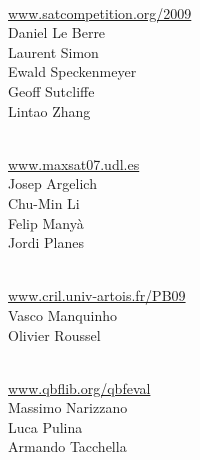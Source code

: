 \documentclass[10pt]{article}
\newcommand{\bthlight}[1]{{\color[rgb]{0.2,0.2,0.5}#1}}
\begin{document}
\begin{minipage}[t]{9.25cm}
  \begin{minipage}[t]{9.25cm}
    \vspace*{0.35cm}
    \begin{minipage}[t]{4.5cm}
      \bthlight{{\bf SAT Competition}} \\
	       {\small \url{www.satcompetition.org/2009}}\\[0.15cm]
	       Daniel Le Berre\\
	       Laurent Simon\\[0.15cm]
	       Ewald Speckenmeyer\\
	       Geoff Sutcliffe \\
	       Lintao Zhang %
    \end{minipage}
    \hspace*{0.5cm}
    \begin{minipage}[t]{4.25cm}
      \bthlight{{\bf MAX-SAT Evaluation}}\\
	       {\small \url{www.maxsat07.udl.es}}\\[0.15cm]
	       Josep Argelich\\
	       Chu-Min Li\\
	       Felip Many\`{a}\\
	       Jordi Planes %
    \end{minipage}

    \begin{minipage}[t]{9.25cm}
      \vspace*{0.25cm}
      \begin{minipage}[t]{4.5cm}
	\bthlight{{\bf PB Evaluation}}\\
		 {\small \url{www.cril.univ-artois.fr/PB09}}\\[0.15cm]
		 Vasco Manquinho\\
		 Olivier Roussel %
      \end{minipage}
      \hspace*{0.5cm} %
      \begin{minipage}[t]{4.25cm}
	\bthlight{{\bf QBF Competition}}\\
		 {\small \url{www.qbflib.org/qbfeval}}\\[0.15cm]
		 Massimo Narizzano \\
		 Luca Pulina \\
		 Armando Tacchella %
      \end{minipage}
    \end{minipage}
  \end{minipage}


\end{minipage}
%
\end{document}
